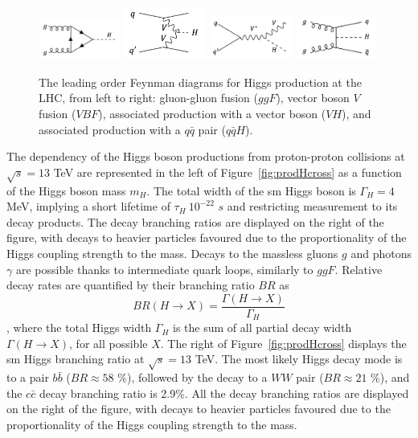 \begin{figure}[h!]
    \center
    \includegraphics[width=0.24\textwidth]{Images/Theory/ggH.png}
    \includegraphics[width=0.24\textwidth]{Images/Theory/vvH.png}
    \includegraphics[width=0.24\textwidth]{Images/Theory/vh.png}
    \includegraphics[width=0.24\textwidth]{Images/Theory/qqH.png}
    \caption{The leading order Feynman diagrams for Higgs production at the LHC, from left to right: gluon-gluon fusion ($ggF$), vector boson $V$ fusion ($VBF$), associated production with a vector boson ($VH$), and associated production with a $q\bar{q}$ pair ($q\bar{q}H$).}
    \label{fig:prodH}
\end{figure}

The dependency of the Higgs boson productions from proton-proton collisions at $\sqrt{s} = 13$ TeV are represented in the left of Figure~\ref{fig:prodHcross} as a function of the Higgs boson mass $m_H$. The total width of the \gls{sm} Higgs boson is $\Gamma_H = 4$ MeV, implying a short lifetime of $\tau_H ~ 10^{-22}$ $s$ and restricting measurement to its decay products. The decay branching ratios are displayed on the right of the figure, with decays to heavier particles favoured due to the proportionality of the Higgs coupling strength to the mass. Decays to the massless gluons $g$ and photons $\gamma$ are possible thanks to intermediate quark loops, similarly to $ggF$. Relative decay rates are quantified by their branching ratio $BR$ as
\begin{equation}
    BR(H \rightarrow X) = \frac{\Gamma(H\rightarrow X)}{\Gamma_H}
\end{equation},
where the total Higgs width $\Gamma_H$ is the sum of all partial decay width $\Gamma(H\rightarrow X)$, for all possible $X$. The right of Figure~\ref{fig:prodHcross} displays the \gls{sm} Higgs branching ratio at $\sqrt{s} = 13$ TeV. The most likely Higgs decay mode is to a pair $b\bar{b}$ ($BR \approx 58$ \%), followed by the decay to a $WW$ pair ($BR \approx 21$ \%), and the $c\bar{c}$ decay branching ratio is 2.9\%. All the decay branching ratios are displayed on the right of the figure, with decays to heavier particles favoured due to the proportionality of the Higgs coupling strength to the mass. \\

